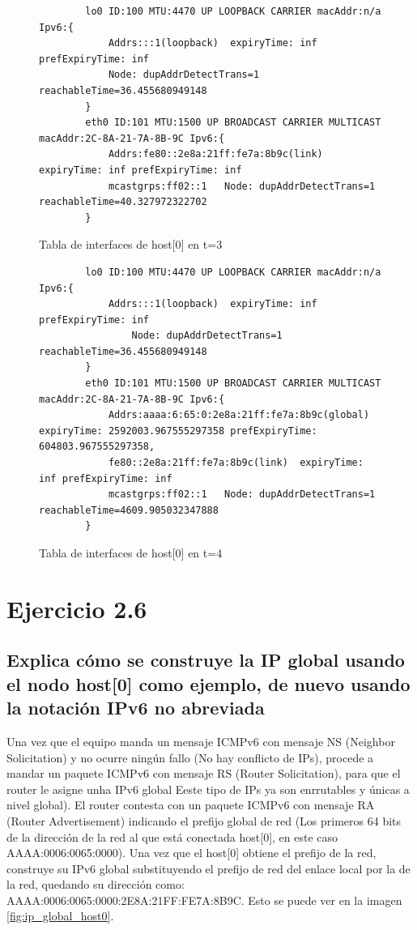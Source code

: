 \begin{figure}[H]
    \centering
    \begin{lstlisting}
        lo0 ID:100 MTU:4470 UP LOOPBACK CARRIER macAddr:n/a Ipv6:{
            Addrs:::1(loopback)  expiryTime: inf prefExpiryTime: inf
            Node: dupAddrDetectTrans=1 reachableTime=36.455680949148
        }
        eth0 ID:101 MTU:1500 UP BROADCAST CARRIER MULTICAST macAddr:2C-8A-21-7A-8B-9C Ipv6:{
            Addrs:fe80::2e8a:21ff:fe7a:8b9c(link)  expiryTime: inf prefExpiryTime: inf
            mcastgrps:ff02::1 	Node: dupAddrDetectTrans=1 reachableTime=40.327972322702
        }
    \end{lstlisting}
    \caption{Tabla de interfaces de host[0] en t=3}
    \label{fig:InterfaceTablePostLocal}
\end{figure}

\begin{figure}[H]
    \centering
    \begin{lstlisting}
        lo0 ID:100 MTU:4470 UP LOOPBACK CARRIER macAddr:n/a Ipv6:{
            Addrs:::1(loopback)  expiryTime: inf prefExpiryTime: inf
                Node: dupAddrDetectTrans=1 reachableTime=36.455680949148
        }
        eth0 ID:101 MTU:1500 UP BROADCAST CARRIER MULTICAST macAddr:2C-8A-21-7A-8B-9C Ipv6:{
            Addrs:aaaa:6:65:0:2e8a:21ff:fe7a:8b9c(global)  expiryTime: 2592003.967555297358 prefExpiryTime: 604803.967555297358, 	
            fe80::2e8a:21ff:fe7a:8b9c(link)  expiryTime: inf prefExpiryTime: inf
            mcastgrps:ff02::1 	Node: dupAddrDetectTrans=1 reachableTime=4609.905032347888
        }
    \end{lstlisting}
    \caption{Tabla de interfaces de host[0] en t=4}
    \label{fig:InterfaceTablePostGlobal}
\end{figure}

\section{Ejercicio 2.6}
\subsection{Explica cómo se construye la IP global usando el nodo host[0] como ejemplo, de nuevo usando la notación
IPv6 no abreviada}

Una vez que el equipo manda un mensaje ICMPv6 con mensaje NS (Neighbor Solicitation) y no ocurre ningún fallo (No hay conflicto de IPs), procede a mandar un paquete ICMPv6 con mensaje RS (Router Solicitation), para que el router le asigne unha IPv6 global Eeste tipo de IPs ya son enrrutables y únicas a nivel global). El router contesta con un paquete ICMPv6 con mensaje RA (Router Advertisement) indicando el prefijo global de red (Los primeros 64 bits de la dirección de la red al que está conectada host[0], en este caso AAAA:0006:0065:0000). Una vez que el host[0] obtiene el prefijo de la red, construye su IPv6 global substituyendo el prefijo de red del enlace local por la de la red, quedando su dirección como: AAAA:0006:0065:0000:2E8A:21FF:FE7A:8B9C. Esto se puede ver en la imagen \ref{fig:ip_global_host0}.

